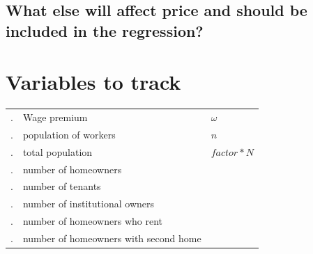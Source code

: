 \subsection{What else will affect price and should be included in the regression?}

\newcommand{\num}{\addtocounter{foo}{1}\thefoo. &}
\section{Variables to track}


\begin{tabular}{lp{5cm}l}
\hline
\num Wage premium  &$\omega$\\
\num  population of workers &$n$\\
\num total population & $factor * N$\\
\num number of homeowners &\\
\num number of tenants &\\
\num number of institutional owners &\\
\num number of homeowners who rent&\\
\num number of homeowners with second home&\\


\end{tabular}
